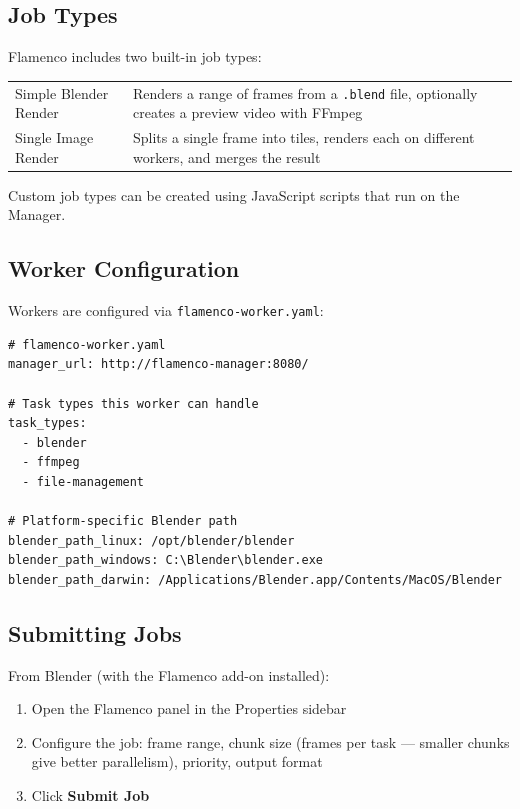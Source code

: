 \subsection{Job Types}

Flamenco includes two built-in job types:

\begin{center}
\begin{tabularx}{\textwidth}{L{4cm}X}
\toprule
{}
 &  \\
\midrule
Simple Blender Render & Renders a range of frames from a \texttt{.blend} file, optionally creates a preview video with FFmpeg \\
Single Image Render & Splits a single frame into tiles, renders each on different workers, and merges the result \\
\bottomrule
\end{tabularx}
\end{center}

Custom job types can be created using JavaScript scripts that run on the Manager.

\subsection{Worker Configuration}

Workers are configured via \texttt{flamenco-worker.yaml}:

\begin{lstlisting}[language={}]
# flamenco-worker.yaml
manager_url: http://flamenco-manager:8080/

# Task types this worker can handle
task_types:
  - blender
  - ffmpeg
  - file-management

# Platform-specific Blender path
blender_path_linux: /opt/blender/blender
blender_path_windows: C:\Blender\blender.exe
blender_path_darwin: /Applications/Blender.app/Contents/MacOS/Blender
\end{lstlisting}

\subsection{Submitting Jobs}

From Blender (with the Flamenco add-on installed):

\begin{enumerate}[leftmargin=2em]
  \item Open the Flamenco panel in the Properties sidebar
  \item Configure the job: frame range, chunk size (frames per task --- smaller chunks give better parallelism), priority, output format
  \item Click \textbf{Submit Job}
\end{enumerate}

